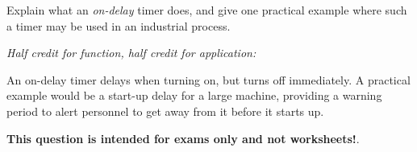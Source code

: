 

Explain what an {\it on-delay} timer does, and give one practical example where such a timer may be used in an industrial process.







{\it Half credit for function, half credit for application:}

\vskip 10pt

An on-delay timer delays when turning on, but turns off immediately.  A practical example would be a start-up delay for a large machine, providing a warning period to alert personnel to get away from it before it starts up.







{\bf This question is intended for exams only and not worksheets!}.



